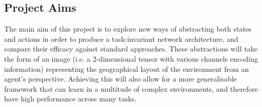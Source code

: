 \subsection{Project Aims}

The main aim of this project is to explore new ways of abstracting both states and actions in order to produce a task-invariant network architecture, and compare their efficacy against standard approaches. These abstractions will take the form of an image (i.e. a 2-dimensional tensor with various channels encoding information) representing the geographical layout of the environment from an agent's perspective. Achieving this will also allow for a more generalisable framework that can learn in a multitude of complex environments, and therefore have high performance across many tasks. 


